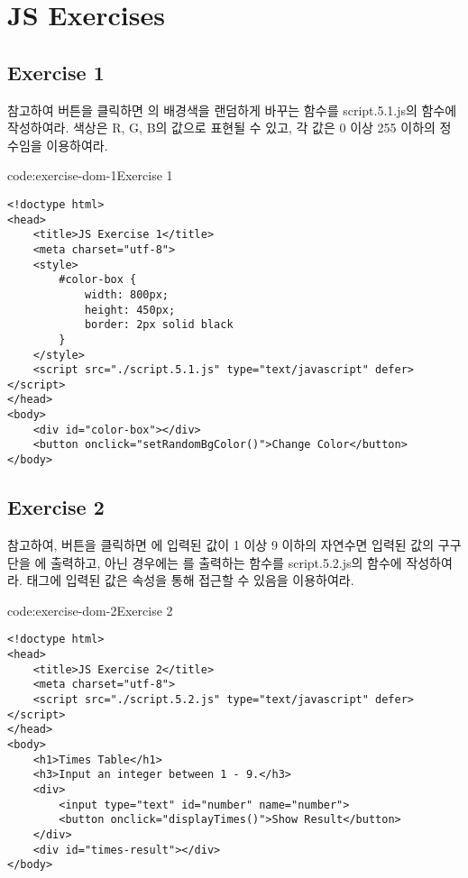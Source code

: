 \section{JS Exercises} \label{sect:js-exercises}

\subsection*{Exercise 1}

\을 참고하여 버튼을 클릭하면 의 배경색을 랜덤하게 바꾸는 함수를 script.5.1.js의  함수에 작성하여라. 색상은 R, G, B의 값으로 표현될 수 있고, 각 값은 0 이상 255 이하의 정수임을 이용하여라.

\begin{codeenv}{code:exercise-dom-1}{Exercise 1}\begin{verbatim}
<!doctype html>
<head>
    <title>JS Exercise 1</title>
    <meta charset="utf-8">
    <style>
        #color-box {
            width: 800px;
            height: 450px;
            border: 2px solid black
        }
    </style>
    <script src="./script.5.1.js" type="text/javascript" defer></script>
</head>
<body>
    <div id="color-box"></div>
    <button onclick="setRandomBgColor()">Change Color</button>
</body>
\end{verbatim}
\end{codeenv}

\subsection*{Exercise 2}

\를 참고하여, 버튼을 클릭하면 에 입력된 값이 1 이상 9 이하의 자연수면 입력된 값의 구구단을 에 출력하고, 아닌 경우에는 를 출력하는 함수를 script.5.2.js의  함수에 작성하여라.  태그에 입력된 값은  속성을 통해 접근할 수 있음을 이용하여라.

\begin{codeenv}{code:exercise-dom-2}{Exercise 2}\begin{verbatim}
<!doctype html>
<head>
    <title>JS Exercise 2</title>
    <meta charset="utf-8">
    <script src="./script.5.2.js" type="text/javascript" defer></script>
</head>
<body>
    <h1>Times Table</h1>
    <h3>Input an integer between 1 - 9.</h3>
    <div>
        <input type="text" id="number" name="number">
        <button onclick="displayTimes()">Show Result</button>
    </div>
    <div id="times-result"></div>
</body>
\end{verbatim}
\end{codeenv}

